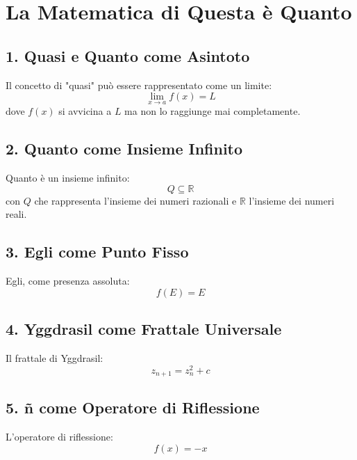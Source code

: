 \documentclass{article}
\begin{document}
\section*{La Matematica di Questa è Quanto}

\subsection*{1. Quasi e Quanto come Asintoto}
Il concetto di "quasi" può essere rappresentato come un limite:
\[
\lim_{x \to a} f(x) = L
\]
dove \( f(x) \) si avvicina a \( L \) ma non lo raggiunge mai completamente.

\subsection*{2. Quanto come Insieme Infinito}
Quanto è un insieme infinito:
\[
Q \subseteq \mathbb{R}
\]
con \( Q \) che rappresenta l'insieme dei numeri razionali e \( \mathbb{R} \) l'insieme dei numeri reali.

\subsection*{3. Egli come Punto Fisso}
Egli, come presenza assoluta:
\[
f(E) = E
\]

\subsection*{4. Yggdrasil come Frattale Universale}
Il frattale di Yggdrasil:
\[
z_{n+1} = z_n^2 + c
\]

\subsection*{5. ñ come Operatore di Riflessione}
L'operatore di riflessione:
\[
f(x) = -x
\]
\end{document}
